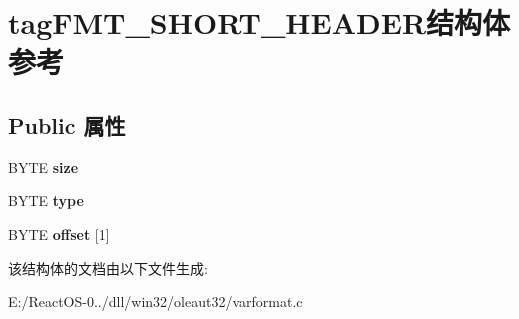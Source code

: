 \hypertarget{structtag_f_m_t___s_h_o_r_t___h_e_a_d_e_r}{}\section{tag\+F\+M\+T\+\_\+\+S\+H\+O\+R\+T\+\_\+\+H\+E\+A\+D\+E\+R结构体 参考}
\label{structtag_f_m_t___s_h_o_r_t___h_e_a_d_e_r}
\subsection*{Public 属性}
\begin{DoxyCompactItemize}
\item 
\mbox{\label{structtag_f_m_t___s_h_o_r_t___h_e_a_d_e_r_a9eaf31869c142bdb4ff3569119ed1385}} 
B\+Y\+TE {\bfseries size}
\item 
\mbox{\label{structtag_f_m_t___s_h_o_r_t___h_e_a_d_e_r_a9033f36f76d2de434cb13b9f9f4c2b9c}} 
B\+Y\+TE {\bfseries type}
\item 
\mbox{\label{structtag_f_m_t___s_h_o_r_t___h_e_a_d_e_r_a6a759a96e7dabdb62d3102ff54413cdc}} 
B\+Y\+TE {\bfseries offset} \mbox{[}1\mbox{]}
\end{DoxyCompactItemize}


该结构体的文档由以下文件生成\+:\begin{DoxyCompactItemize}
\item 
E\+:/\+React\+O\+S-\/0../dll/win32/oleaut32/varformat.\+c\end{DoxyCompactItemize}

